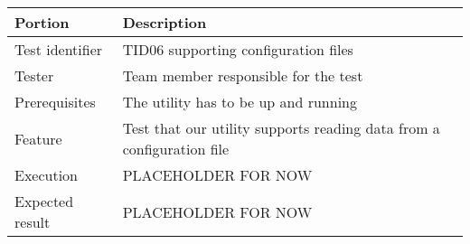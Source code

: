 \begin{table}[H]
\begin{tabularx}{\textwidth}{l X}
\hline\hline
Portion & Description\\[0.5ex]
\hline
Test identifier & TID06 supporting configuration files\\[0.5ex]
Tester & Team member responsible for the test\\[0.5ex]
Prerequisites & The utility has to be up and running\\[0.5ex]
Feature & Test that our utility supports reading data from a configuration file \\[0.5ex]
Execution & PLACEHOLDER FOR NOW\\[0.5ex]
Expected result & PLACEHOLDER FOR NOW\\[0.5ex]
\hline\hline
\end{tabularx}

\end{table}

